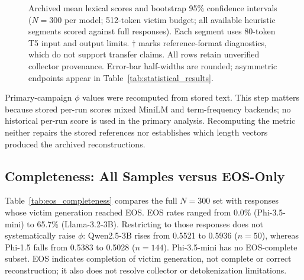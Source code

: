 \documentclass[electronics,article,submit,pdftex,moreauthors]{Definitions/mdpi}
\begin{document}
\begin{figure}[ht]
\centering
{}
\caption{Archived mean lexical scores and bootstrap 95\% confidence intervals ($N=300$ per model; 512-token victim budget; all available heuristic segments scored against full responses). Each segment uses 80-token T5 input and output limits. $\dagger$ marks reference-format diagnostics, which do not support transfer claims. All rows retain unverified collector provenance. Error-bar half-widths are rounded; asymmetric endpoints appear in Table~\ref{tab:statistical_results}.}
\label{fig:model_ci}
\end{figure}

Primary-campaign $\phi$ values were recomputed from stored text. This step matters because stored per-run scores mixed MiniLM and term-frequency backends; no historical per-run score is used in the primary analysis. Recomputing the metric neither repairs the stored references nor establishes which length vectors produced the archived reconstructions.

\subsection{Completeness: All Samples versus EOS-Only}
Table~\ref{tab:eos_completeness} compares the full $N=300$ set with responses whose victim generation reached EOS. EOS rates ranged from 0.0\% (Phi-3.5-mini) to 65.7\% (Llama-3.2-3B). Restricting to those responses does not systematically raise $\phi$: Qwen2.5-3B rises from 0.5521 to 0.5936 ($n=50$), whereas Phi-1.5 falls from 0.5383 to 0.5028 ($n=144$). Phi-3.5-mini has no EOS-complete subset. EOS indicates completion of victim generation, not complete or correct reconstruction; it also does not resolve collector or detokenization limitations.
\end{document}
